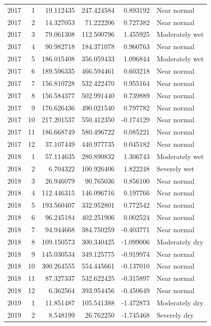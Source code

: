 \begin{tabular}{rrrrrl}
2017 & 1 & 19.112435 & 247.424584 & 0.893192 & Near normal \\
2017 & 2 & 14.327053 & 71.222206 & 0.727382 & Near normal \\
2017 & 3 & 79.061308 & 112.500796 & 1.455925 & Moderately wet \\
2017 & 4 & 90.982718 & 184.371078 & 0.960763 & Near normal \\
2017 & 5 & 186.015408 & 356.059433 & 1.096844 & Moderately wet \\
2017 & 6 & 189.596335 & 466.594461 & 0.603218 & Near normal \\
2017 & 7 & 156.810728 & 532.422470 & 0.955164 & Near normal \\
2017 & 8 & 156.584377 & 502.991440 & 0.739889 & Near normal \\
2017 & 9 & 176.626436 & 490.021540 & 0.797782 & Near normal \\
2017 & 10 & 217.201537 & 550.412350 & -0.174129 & Near normal \\
2017 & 11 & 186.668749 & 580.496722 & 0.085221 & Near normal \\
2017 & 12 & 37.107449 & 440.977735 & 0.045182 & Near normal \\
2018 & 1 & 57.114635 & 280.890832 & 1.306743 & Moderately wet \\
2018 & 2 & 6.704322 & 100.926406 & 1.822248 & Severely wet \\
2018 & 3 & 26.946079 & 90.765036 & 0.856100 & Near normal \\
2018 & 4 & 112.446315 & 146.096716 & 0.197766 & Near normal \\
2018 & 5 & 193.560407 & 332.952801 & 0.772542 & Near normal \\
2018 & 6 & 96.245184 & 402.251906 & 0.002524 & Near normal \\
2018 & 7 & 94.944668 & 384.750259 & -0.403771 & Near normal \\
2018 & 8 & 109.150573 & 300.340425 & -1.099006 & Moderately dry \\
2018 & 9 & 145.030534 & 349.125775 & -0.919974 & Near normal \\
2018 & 10 & 300.264555 & 554.445661 & -0.137010 & Near normal \\
2018 & 11 & 87.327337 & 532.622425 & -0.315897 & Near normal \\
2018 & 12 & 6.362564 & 393.954456 & -0.450649 & Near normal \\
2019 & 1 & 11.851487 & 105.541388 & -1.472873 & Moderately dry \\
2019 & 2 & 8.548199 & 26.762250 & -1.745468 & Severely dry \\

\end{tabular}

